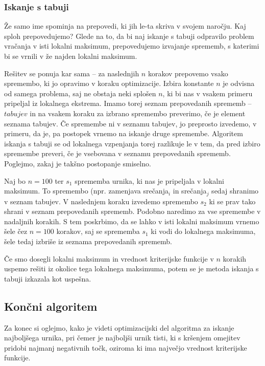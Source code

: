 \documentclass[a4paper,10pt]{article}
\begin{document}
\subsubsection{Iskanje s tabuji} %

Že samo ime spominja na prepovedi, ki jih le-ta skriva v svojem naročju. Kaj sploh prepovedujemo?
Glede na to, da bi naj iskanje s tabuji odpravilo problem vračanja v isti lokalni maksimum,
prepovedujemo izvajanje sprememb, s katerimi bi se vrnili v že najden lokalni maksimum.

Rešitev se ponuja kar sama -- za naslednjih \(n\) korakov prepovemo vsako spremembo, ki jo
opravimo v koraku optimizacije. Izbira konstante \(n\) je odvisna od samega problema, saj
ne obstaja neki splošen \(n\), ki bi nas v vsakem primeru pripeljal iz lokalnega ekstrema.
Imamo torej seznam prepovedanih sprememb -- \emph{\(tabujev\)} in na vsakem koraku za izbrano
spremembo preverimo, če je element seznama tabujev. Če spremembe ni v seznamu tabujev, jo
preprosto izvedemo, v primeru, da je, pa postopek vrnemo na iskanje druge spremembe.
Algoritem iskanja s tabuji se od lokalnega vzpenjanja torej razlikuje le v tem, da pred
izbiro spremembe preveri, če je vsebovana v seznamu prepovedanih sprememb. Poglejmo, zakaj
je takšno postopanje smiselno.

Naj bo \(n = 100\) ter \(s_1\) sprememba urnika, ki nas je pripeljala v lokalni maksimum. To
spremembo (npr. zamenjava srečanja\(_i\) in srečanja\(_j\) sedaj shranimo v
seznam tabujev. V naslednjem koraku izvedemo spremembo \(s_2\) ki se prav tako shrani v
seznam prepovedanih sprememb. Podobno naredimo za vse spremembe v nadaljnih korakih. S
tem poskrbimo, da se lahko v isti lokalni maksimum vrnemo šele čez \(n = 100\) korakov, saj
se sprememba \(s_1\) ki vodi do lokalnega maksimuma, šele tedaj izbriše iz seznama
prepovedanih sprememb.

Če smo dosegli lokalni maksimum in vrednost kriterijske funkcije v \(n\) korakih uspemo
rešiti iz okolice tega lokalnega maksimuma, potem se je metoda iskanja s tabuji izkazala
kot uspešna.

\subsection{Končni algoritem} %

Za konec si oglejmo, kako je videti optimizacijski del algoritma za iskanje najboljšega
urnika, pri čemer je najboljši urnik tisti, ki s kršenjem omejitev pridobi najmanj negativnih
točk, oziroma ki ima največjo vrednost kriterijske funkcije.
\end{document}
